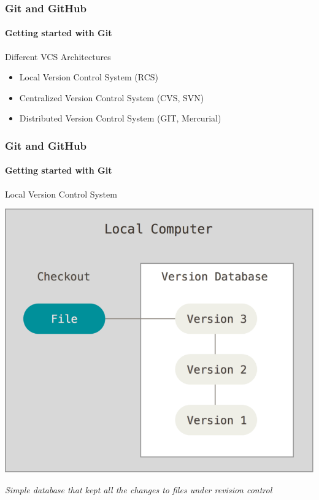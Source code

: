 \begin{frame}
    \frametitle{Git and GitHub}
    \framesubtitle{Getting started with Git}
    \addtocounter{nframe}{1}
    
    \begin{block}{Different VCS Architectures}
        \begin{itemize}
            \item Local Version Control System (RCS)
            \item Centralized Version Control System (CVS, SVN)
            \item Distributed Version Control System (GIT, Mercurial)
        \end{itemize}
    \end{block}

\end{frame}

\begin{frame}
    \frametitle{Git and GitHub}
    \framesubtitle{Getting started with Git}
    \addtocounter{nframe}{1}
    
    \begin{block}{Local Version Control System}
        \begin{center}

            \includegraphics[width=.6\textwidth]{imgs/local.png}
    
        \end{center}
    
    \end{block}

    \textit{Simple database that kept all the changes to files under revision control}

\end{frame}

